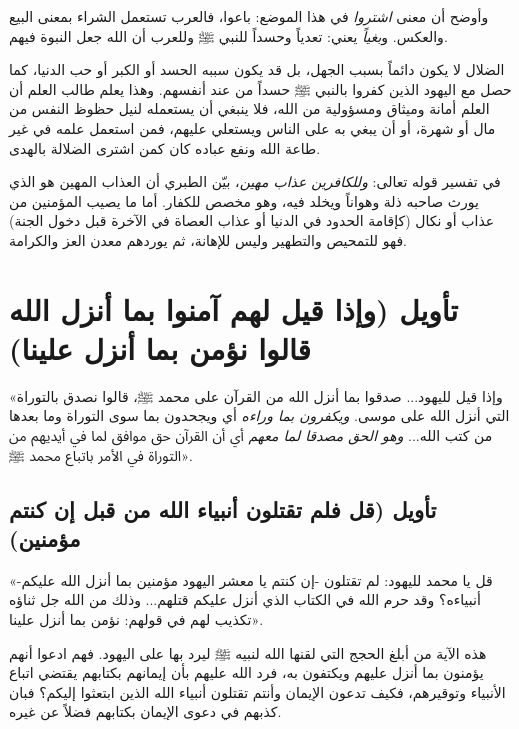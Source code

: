 وأوضح أن معنى \textit{اشتروا} في هذا الموضع: باعوا، فالعرب تستعمل الشراء بمعنى البيع والعكس. و\textit{بغياً} يعني: تعدياً وحسداً للنبي ﷺ وللعرب أن الله جعل النبوة فيهم.

\begin{fawaid}
الضلال لا يكون دائماً بسبب الجهل، بل قد يكون سببه الحسد أو الكبر أو حب الدنيا، كما حصل مع اليهود الذين كفروا بالنبي ﷺ حسداً من عند أنفسهم. وهذا يعلم طالب العلم أن العلم أمانة وميثاق ومسؤولية من الله، فلا ينبغي أن يستعمله لنيل حظوظ النفس من مال أو شهرة، أو أن يبغي به على الناس ويستعلي عليهم، فمن استعمل علمه في غير طاعة الله ونفع عباده كان كمن اشترى الضلالة بالهدى.
\end{fawaid}

\begin{fawaid}
في تفسير قوله تعالى: \textit{وللكافرين عذاب مهين}، بيّن الطبري أن العذاب المهين هو الذي يورث صاحبه ذلة وهواناً ويخلد فيه، وهو مخصص للكفار. أما ما يصيب المؤمنين من عذاب أو نكال (كإقامة الحدود في الدنيا أو عذاب العصاة في الآخرة قبل دخول الجنة) فهو للتمحيص والتطهير وليس للإهانة، ثم يوردهم معدن العز والكرامة.
\end{fawaid}

\separator

\section{تأويل (وإذا قيل لهم آمنوا بما أنزل الله قالوا نؤمن بما أنزل علينا)}
 «وإذا قيل لليهود... صدقوا بما أنزل الله من القرآن على محمد ﷺ، قالوا نصدق بالتوراة التي أنزل الله على موسى. \textit{ويكفرون بما وراءه} أي ويجحدون بما سوى التوراة وما بعدها من كتب الله... \textit{وهو الحق مصدقا لما معهم} أي أن القرآن حق موافق لما في أيديهم من التوراة في الأمر باتباع محمد ﷺ».

\subsection{تأويل (قل فلم تقتلون أنبياء الله من قبل إن كنتم مؤمنين)}
 «قل يا محمد لليهود: لم تقتلون -إن كنتم يا معشر اليهود مؤمنين بما أنزل الله عليكم- أنبياءه؟ وقد حرم الله في الكتاب الذي أنزل عليكم قتلهم... وذلك من الله جل ثناؤه تكذيب لهم في قولهم: نؤمن بما أنزل علينا».

\begin{fawaid}
هذه الآية من أبلغ الحجج التي لقنها الله لنبيه ﷺ ليرد بها على اليهود. فهم ادعوا أنهم يؤمنون بما أنزل عليهم ويكتفون به، فرد الله عليهم بأن إيمانهم بكتابهم يقتضي اتباع الأنبياء وتوقيرهم، فكيف تدعون الإيمان وأنتم تقتلون أنبياء الله الذين ابتعثوا إليكم؟ فبان كذبهم في دعوى الإيمان بكتابهم فضلاً عن غيره.
\end{fawaid}

